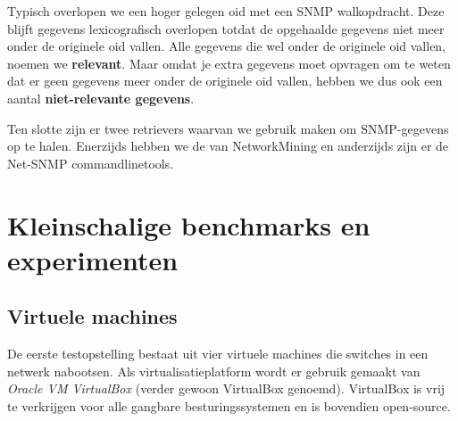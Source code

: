 Typisch overlopen we een hoger gelegen \gls{oid} met een SNMP walkopdracht.
Deze blijft gegevens lexicografisch overlopen totdat de opgehaalde gegevens niet meer onder de originele \gls{oid} vallen.
Alle gegevens die wel onder de originele \gls{oid} vallen, noemen we \textbf{relevant}.
Maar omdat je extra gegevens moet opvragen om te weten dat er geen gegevens meer onder de originele \gls{oid} vallen,
hebben we dus ook een aantal \textbf{niet-relevante gegevens}.

Ten slotte zijn er twee retrievers waarvan we gebruik maken om SNMP-gegevens op te halen.
Enerzijds hebben we de \textbf{\nwmretriever{}} van NetworkMining en anderzijds zijn er de Net-SNMP commandlinetools.

\section{Kleinschalige benchmarks en experimenten}


\subsection{Virtuele machines}
\label{virtualbox}



De eerste testopstelling bestaat uit vier virtuele machines die switches in een netwerk nabootsen.
Als virtualisatieplatform wordt er gebruik gemaakt van \textit{Oracle VM VirtualBox} (verder gewoon VirtualBox genoemd).
VirtualBox is vrij te verkrijgen voor alle gangbare besturingssystemen en is bovendien open-source.

